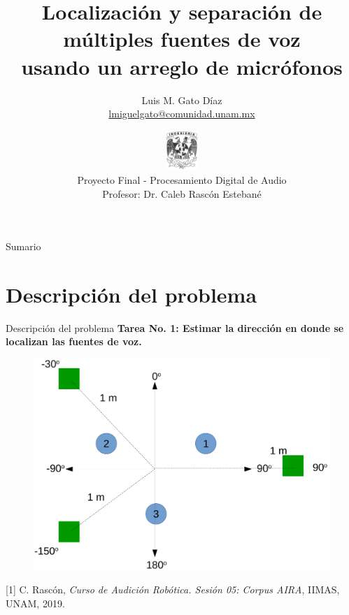 \documentclass[12pt,aspectratio=169]{beamer}
\author[Luis M. Gato Díaz]{\small{Luis M. Gato D\'iaz\\ \href{mailto:lmiguelgato@comunidad.unam.mx}{lmiguelgato@comunidad.unam.mx}}}
\institute[] %
{	
	\tiny{Maestría en Ingeniería Eléctrica,	UNAM}
	
	\tiny{Posgrado de Procesamiento Digital de Señales}
}
\date[\today]
{\includegraphics[height = 15mm]{figures/ingenieriaLOGO}\\
\small{Proyecto Final - Procesamiento Digital de Audio\\Profesor: Dr. Caleb Rascón Estebané}}
\title[Procesamiento Digital de Audio]{Localización y separación de múltiples fuentes de voz \\usando un arreglo de micrófonos}
\begin{document}
	
	\begin{frame}
		\titlepage
	\end{frame}
	
		\LogoOff
	
	\begin{frame}{Sumario}
		\tableofcontents %
	\end{frame}
	

	
	\section{Descripción del problema}
	
	\begin{frame}{Descripción del problema}
		\textbf{Tarea No. 1: Estimar la dirección en donde se localizan las fuentes de voz.}
		\begin{figure}[h]
			\includegraphics[width=0.55\linewidth]{figures/array1.png}
		\end{figure}
	\tiny{[1] C. Rascón, \textit{Curso de Audición Robótica. Sesión 05: Corpus AIRA}, IIMAS, UNAM, 2019.}
	\end{frame}
	
\end{document}
